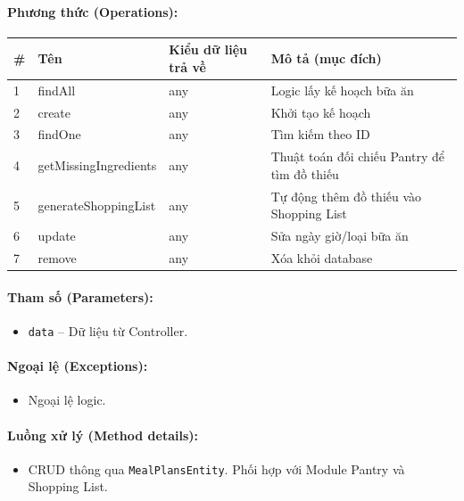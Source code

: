 \documentclass[12pt,a4paper]{article}
\begin{document}
\paragraph{Phương thức (Operations):}
\begin{longtable}{|p{0.6cm}|p{3.8cm}|p{2.6cm}|p{6.5cm}|}
\hline
\textbf{\#} & \textbf{Tên} & \textbf{Kiểu dữ liệu trả về} & \textbf{Mô tả (mục đích)} \\ \hline
\endhead
1 & findAll & any & Logic lấy kế hoạch bữa ăn \\ \hline
2 & create & any & Khởi tạo kế hoạch \\ \hline
3 & findOne & any & Tìm kiếm theo ID \\ \hline
4 & getMissingIngredients & any & Thuật toán đối chiếu Pantry để tìm đồ thiếu \\ \hline
5 & generateShoppingList & any & Tự động thêm đồ thiếu vào Shopping List \\ \hline
6 & update & any & Sửa ngày giờ/loại bữa ăn \\ \hline
7 & remove & any & Xóa khỏi database \\ \hline
\end{longtable}

\paragraph{Tham số (Parameters):}
\begin{itemize}[leftmargin=*]
    \item \texttt{data} – Dữ liệu từ Controller.
\end{itemize}


\paragraph{Ngoại lệ (Exceptions):}
\begin{itemize}[leftmargin=*]
    \item Ngoại lệ logic.
\end{itemize}


\paragraph{Luồng xử lý (Method details):}
\begin{itemize}[leftmargin=*]
    \item CRUD thông qua \texttt{MealPlansEntity}. Phối hợp với Module Pantry và Shopping List.
\end{itemize}
\end{document}
